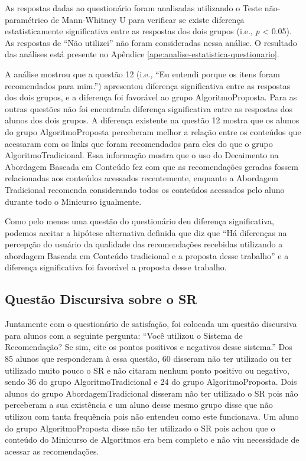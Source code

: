 As respostas dadas ao questionário foram analisadas utilizando o Teste não-paramétrico de
Mann-Whitney U para verificar se existe diferença estatisticamente significativa entre as respostas dos dois grupos (i.e., \textit{p} < 0.05).
As respostas de ``Não utilizei'' não foram consideradas nessa análise. O resultado das análises está presente no Apêndice
\ref{ape:analise-estatistica-questionario}.

A análise mostrou que a questão 12 (i.e., ``Eu entendi porque os itens foram recomendados para mim.'') apresentou
diferença significativa entre as respostas dos dois grupos, e a diferença foi favorável ao grupo AlgoritmoProposta.
Para as outras questões não foi encontrada diferença significativa entre as respostas dos
alunos dos dois grupos. A diferença existente na questão 12 mostra que os alunos do grupo AlgoritmoProposta perceberam
melhor a relação entre os conteúdos que acessaram com os links que foram recomendados para eles
do que o grupo AlgoritmoTradicional. Essa informação mostra que o uso do Decaimento na Abordagem
Baseada em Conteúdo fez com que as recomendações geradas fossem relacionadas aos conteúdos acessados recentemente,
enquanto a Abordagem Tradicional recomenda considerando todos os conteúdos acessados pelo aluno durante todo o Minicurso
igualmente.

Como pelo menos uma questão do questionário deu diferença significativa, podemos aceitar a hipótese alternativa definida
que diz que ``Há diferenças na percepção do usuário da qualidade das recomendações recebidas utilizando a abordagem
Baseada em Conteúdo tradicional e a proposta desse trabalho'' e a diferença significativa foi favorável a proposta desse trabalho.

\subsection{Questão Discursiva sobre o SR}\label{subsection:questao-aberta}

Juntamente com o questionário de satisfação, foi colocada um questão discursiva para alunos com a seguinte pergunta:
``Você utilizou o Sistema de Recomendação? Se sim, cite os pontos positivos e negativos desse sistema.'' Dos 85 alunos
que responderam à essa questão, 60 disseram não ter utilizado ou ter utilizado muito pouco o SR
e não citaram nenhum ponto positivo ou negativo, sendo 36 do grupo AlgoritmoTradicional
e 24 do grupo AlgoritmoProposta. Dois alunos do grupo AbordagemTradicional disseram
não ter utilizado o SR pois não perceberam a sua existência e um aluno desse mesmo grupo disse que não utilizou com tanta frequência
pois não entendeu como este funcionava. Um aluno do grupo AlgoritmoProposta disse não ter utilizado
o SR pois achou que o conteúdo do Minicurso de Algoritmos era bem completo e não viu necessidade de acessar as recomendações.

